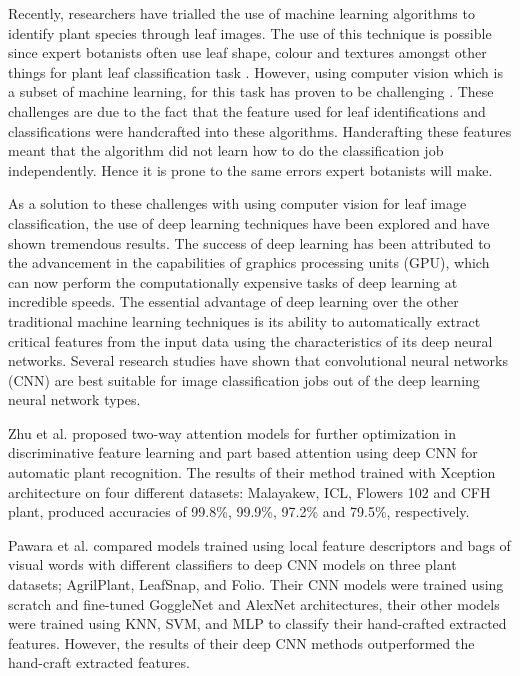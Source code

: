 \documentclass[conference]{IEEEtran}
\begin{document}
Recently, researchers have trialled the use of machine learning algorithms to identify plant species through leaf images. The use of this technique is possible since expert botanists often use leaf shape, colour and textures amongst other things for plant leaf classification task \cite{xiao2010hog, kadir2013leaf}. However, using computer vision which is a subset of machine learning, for this task has proven to be challenging \cite{kamilaris2018deep}. These challenges are due to the fact that the feature used for leaf identifications and classifications were handcrafted into these algorithms. Handcrafting these features meant that the algorithm did not learn how to do the classification job independently. Hence it is prone to the same errors expert botanists will make.

As a solution to these challenges with using computer vision for leaf image classification, the use of deep learning techniques have been explored and have shown tremendous results. The success of deep learning has been attributed to the advancement in the capabilities of graphics processing units (GPU), which can now perform the computationally expensive tasks of deep learning at incredible speeds. The essential advantage of deep learning over the other traditional machine learning techniques is its ability to automatically extract critical features from the input data using the characteristics of its deep neural networks. Several research studies have shown that convolutional neural networks (CNN) are best suitable for image classification jobs out of the deep learning neural network types.

Zhu et al. \cite{zhu2019ta} proposed two-way attention models for further optimization in discriminative feature learning and part based attention using deep CNN for automatic plant recognition. The results of their method trained with Xception architecture on four different datasets: Malayakew, ICL, Flowers 102 and CFH plant, produced accuracies of 99.8\%, 99.9\%, 97.2\% and 79.5\%, respectively.

Pawara et al. \cite{pawara2017comparing} compared models trained using local feature descriptors and bags of visual words with different classifiers to deep CNN models on three plant datasets; AgrilPlant, LeafSnap, and Folio. Their CNN models were trained using scratch and fine-tuned GoggleNet and AlexNet architectures, their other models were trained using KNN, SVM, and MLP to classify their hand-crafted extracted features. However, the results of their deep CNN methods outperformed the hand-craft extracted features.
\end{document}
